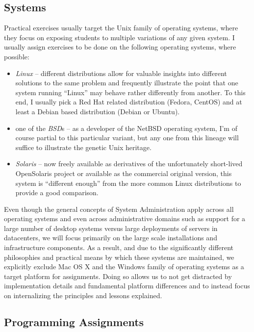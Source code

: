 \subsection*{Systems}

Practical exercises usually target the Unix family of
operating systems, where they focus on exposing
students to multiple variations of any given system.
I usually assign exercises to be done on the following
operating systems, where possible:

\begin{itemize}
	\item {\em Linux} -- different distributions allow for valuable
		insights into different solutions to the same problem and
		frequently illustrate the point that one system running
		``Linux'' may behave rather differently from another.
		To this end, I usually pick a Red Hat related distribution
		(Fedora, CentOS) and at least a Debian based distribution
		(Debian or Ubuntu).
	\item one of the {\em BSD}s -- as a developer of the NetBSD
		operating system, I'm of course partial to this particular
		variant, but any one from this lineage will suffice to
		illustrate the genetic Unix heritage.
	\item {\em Solaris} -- now freely available as derivatives
		of the unfortunately short-lived OpenSolaris project or
		available as the commercial original version,
		this system is ``different enough'' from the more common Linux
		distributions to provide a good comparison.
\end{itemize}

Even though the general concepts of System
Administration apply across all operating systems and
even across administrative domains such as support for
a large number of desktop systems versus large
deployments of servers in datacenters, we will focus
primarily on the large scale installations and
infrastructure components.  As a result, and due to
the significantly different philosophies and practical
means by which these systems are maintained, we
explicitly exclude Mac OS X and the Windows family of
operating systems as a target platform for
assignments.  Doing so allows us to not get distracted
by implementation details and fundamental platform
differences and to instead focus on internalizing the
principles and lessons explained.


\subsection*{Programming Assignments}

